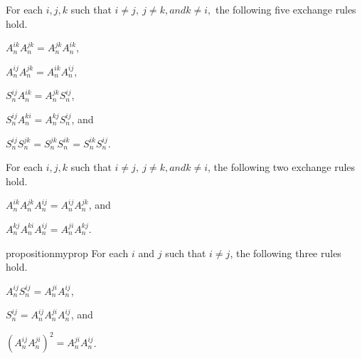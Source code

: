 \begin{proposition}
For each $ i,j,k $ such that $ i\neq j,\ j\neq k, and k\neq i, $ the following five exchange rules hold.

\begin{enumerate*}[label=(\arabic*),itemjoin={\quad}]
	\item $ A_n^{ik}A_n^{jk}=A_n^{jk}A_n^{ik} $,
	\item $ A_n^{ij}A_n^{jk}=A_n^{ik}A_n^{ij} $,
	\item $ S_n^{ij}A_n^{ik}=A_n^{jk}S_n^{ij} $,
	\item $ S_n^{ij}A_n^{ki}=A_n^{kj}S_n^{ij} $, and
	\item $ S_n^{ij}S_n^{jk}=S_n^{jk}S_n^{ik}=S_n^{ik}S_n^{ij} $.
\end{enumerate*}
\end{proposition}

\begin{proposition}
For each $ i,j,k $ such that $ i\neq j,\ j\neq k, and k\neq i $, the following two exchange rules hold.

\begin{enumerate*}[label=(\arabic*),itemjoin={\quad}]
	\item $ A_n^{ik}A_n^{jk}A_n^{ij}=A_n^{ij} A_n^{jk} $, and
	\item $ A_n^{kj}A_n^{ki}A_n^{ij}=A_n^{ji}A_n^{kj} $.
\end{enumerate*}
\end{proposition}


\begin{restatable}{proposition}{myprop}
	\label{prop:myprop}
For each $ i $ and $ j $ such that $ i\neq j $, the following three rules hold.

\begin{enumerate*}[label=(\arabic*),itemjoin={\quad}]
	\item $ A_n^{ij}S_n^{ij}=A_n^{ji}A_n^{ij} $,
	\item $ S_n^{ij}=A_n^{ij}A_n^{ji}A_n^{ij} $, and
	\item $ \left(A_n^{ij}A_n^{ji}\right)^2=A_n^{ji}A_n^{ij} $.
\end{enumerate*}
\end{restatable}




